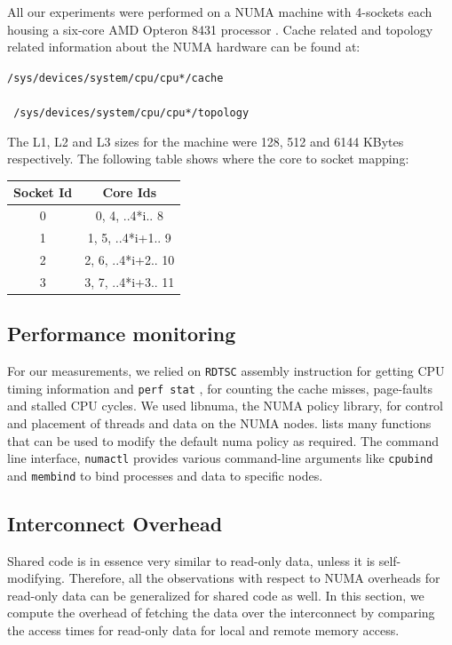 
All our experiments were performed on a NUMA machine with 4-sockets each housing a six-core AMD Opteron 8431 processor \cite{opteron}.
Cache related and topology related information about the NUMA hardware can be found at:

\texttt{/sys/devices/system/cpu/cpu*/cache } \\
\\
\texttt{ /sys/devices/system/cpu/cpu*/topology }

The L1, L2 and L3 sizes for the machine were 128, 512 and 6144 KBytes respectively. The following table shows where the
core to socket mapping:

\begin{center}
\begin{tabular}{c|c}
\hline
Socket Id & Core Ids\\
\hline
0 & 0, 4, ..4*i.. 8\\ 
1 & 1, 5, ..4*i+1.. 9 \\
2 & 2, 6, ..4*i+2.. 10\\
3 & 3, 7, ..4*i+3.. 11\\
\hline
\end{tabular}
\end{center}


\subsection{Performance monitoring}
For our measurements, we relied on \texttt{RDTSC} assembly instruction\cite{timeStampCounter} for getting CPU timing information
and \texttt{perf stat} \cite{perfWiki}, for counting the cache misses, page-faults and stalled CPU cycles. We used libnuma,
the NUMA policy library, for control and placement of threads and data on the NUMA nodes. \cite{libNuma} lists many functions
that can be used to modify the default numa policy as required. The command line interface, \texttt{numactl} \cite{numactl} 
provides various command-line arguments like \texttt{cpubind} and \texttt{membind} to bind processes and data to specific nodes.

\subsection{Interconnect Overhead}
Shared code is in essence very similar to read-only data, unless it is self-modifying.
Therefore, all the observations with respect to NUMA overheads for read-only data can be generalized for shared code as well.
In this section, we compute the overhead of fetching the data over the interconnect by comparing the access times for read-only
data for local and remote memory access.

